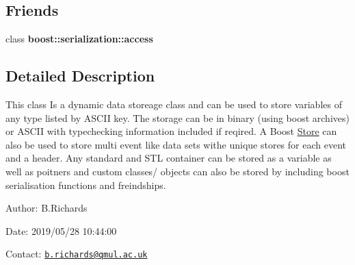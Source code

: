 \subsection*{Friends}
\begin{DoxyCompactItemize}
\item 
\hypertarget{classBoostStore_a4305f269960e8ccc92b19b2f0480b16d}{class {\bfseries boost\-::serialization\-::access}}\label{classBoostStore_a4305f269960e8ccc92b19b2f0480b16d}

\end{DoxyCompactItemize}


\subsection{Detailed Description}
This class Is a dynamic data storeage class and can be used to store variables of any type listed by A\-S\-C\-I\-I key. The storage can be in binary (using boost archives) or A\-S\-C\-I\-I with typechecking information included if reqired. A Boost \hyperlink{classStore}{Store} can also be used to store multi event like data sets withe unique stores for each event and a header. Any standard and S\-T\-L container can be stored as a variable as well as poitners and custom classes/ objects can also be stored by including boost serialisation functions and freindships.

\begin{DoxyParagraph}{Author\-:}
B.\-Richards 
\end{DoxyParagraph}
\begin{DoxyParagraph}{Date\-:}
2019/05/28 10\-:44\-:00 
\end{DoxyParagraph}
Contact\-: \href{mailto:b.richards@qmul.ac.uk}{\tt b.\-richards@qmul.\-ac.\-uk} 

